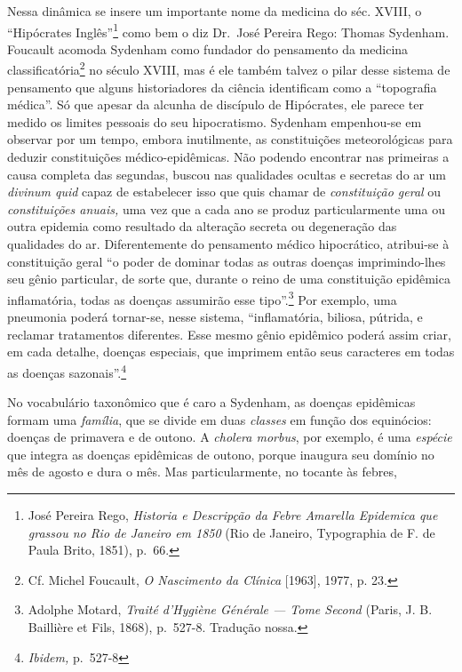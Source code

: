 Nessa dinâmica se insere um importante nome da medicina do séc. XVIII, o
``Hipócrates Inglês''\footnote{José Pereira Rego, \textit{Historia e
  Descripção da Febre Amarella Epidemica que grassou no Rio de Janeiro
  em 1850} (Rio de Janeiro, Typographia de F. de Paula Brito, 1851),
  p.~66.} como bem o diz Dr.~José Pereira Rego: Thomas Sydenham.
Foucault acomoda Sydenham como fundador do pensamento da medicina
classificatória\footnote{Cf. Michel Foucault, \textit{O Nascimento da
  Clínica} {[}1963{]}, 1977, p. 23.} no século XVIII, mas é ele também
talvez o pilar desse sistema de pensamento que alguns historiadores da
ciência identificam como a ``topografia médica''. Só que apesar da
alcunha de discípulo de Hipócrates, ele parece ter medido os limites
pessoais do seu hipocratismo. Sydenham empenhou-se em observar por um
tempo, embora inutilmente, as constituições meteorológicas para deduzir
constituições médico-epidêmicas. Não podendo encontrar nas primeiras a
causa completa das segundas, buscou nas qualidades ocultas e secretas do
ar um \textit{divinum quid} capaz de estabelecer isso que quis chamar de
\textit{constituição geral} ou \textit{constituições anuais,} uma vez que a
cada ano se produz particularmente uma ou outra epidemia como resultado
da alteração secreta ou degeneração das qualidades do ar. Diferentemente
do pensamento médico hipocrático, atribui-se à constituição geral ``o
poder de dominar todas as outras doenças imprimindo-lhes seu gênio
particular, de sorte que, durante o reino de uma constituição epidêmica
inflamatória, todas as doenças assumirão esse tipo''.\footnote{Adolphe
  Motard, \textit{Traité d'Hygiène Générale --- Tome Second} (Paris, J. B.
  Baillière et Fils, 1868), p.~527-8. Tradução nossa.} Por exemplo, uma
pneumonia poderá tornar-se, nesse sistema, ``inflamatória, biliosa,
pútrida, e reclamar tratamentos diferentes. Esse mesmo gênio epidêmico
poderá assim criar, em cada detalhe, doenças especiais, que imprimem
então seus caracteres em todas as doenças sazonais''.\footnote{\textit{Ibidem,}
  p.~527-8}

No vocabulário taxonômico que é caro a Sydenham, as doenças epidêmicas
formam uma \textit{família}, que se divide em duas \textit{classes} em
função dos equinócios: doenças de primavera e de outono. A \textit{cholera
morbus}, por exemplo, é uma \textit{espécie} que integra as doenças
epidêmicas de outono, porque inaugura seu domínio no mês de agosto e
dura o mês. Mas particularmente, no tocante às febres,

